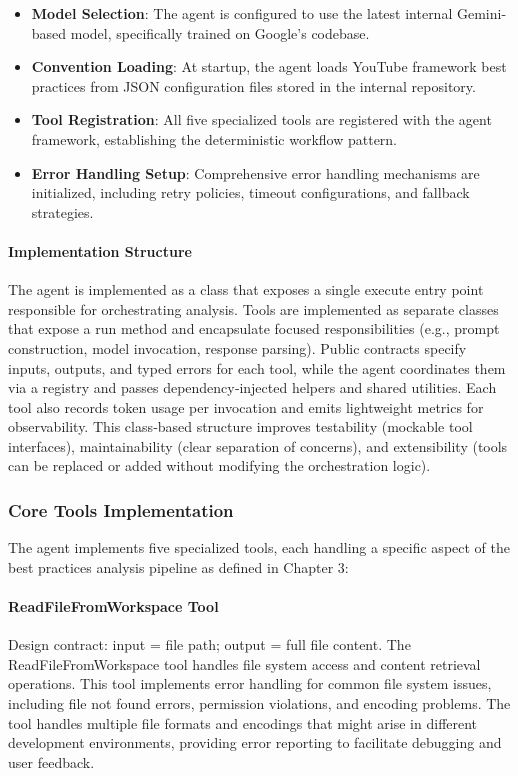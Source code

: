 \begin{spacing}{1.2}
\begin{itemize}
    \item \textbf{Model Selection}: The agent is configured to use the latest internal Gemini-based model, specifically trained on Google's codebase.
    \item \textbf{Convention Loading}: At startup, the agent loads YouTube framework best practices from JSON configuration files stored in the internal repository.
    \item \textbf{Tool Registration}: All five specialized tools are registered with the agent framework, establishing the deterministic workflow pattern.
    \item \textbf{Error Handling Setup}: Comprehensive error handling mechanisms are initialized, including retry policies, timeout configurations, and fallback strategies.
\end{itemize}


\paragraph{Implementation Structure}
The agent is implemented as a class that exposes a single execute entry point responsible for orchestrating analysis. Tools are implemented as separate classes that expose a run method and encapsulate focused responsibilities (e.g., prompt construction, model invocation, response parsing). Public contracts specify inputs, outputs, and typed errors for each tool, while the agent coordinates them via a registry and passes dependency‑injected helpers and shared utilities. Each tool also records token usage per invocation and emits lightweight metrics for observability. This class‑based structure improves testability (mockable tool interfaces), maintainability (clear separation of concerns), and extensibility (tools can be replaced or added without modifying the orchestration logic).
\subsubsection{Core Tools Implementation}
The agent implements five specialized tools, each handling a specific aspect of the best practices analysis pipeline as defined in Chapter 3:

\paragraph{ReadFileFromWorkspace Tool}
Design contract: input = file path; output = full file content.
The ReadFileFromWorkspace tool handles file system access and content retrieval operations. This tool implements error handling for common file system issues, including file not found errors, permission violations, and encoding problems. The tool handles multiple file formats and encodings that might arise in different development environments, providing error reporting to facilitate debugging and user feedback.


\end{spacing}

